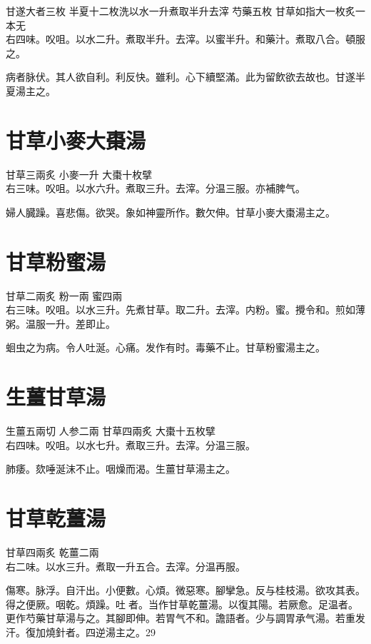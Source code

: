 甘遂{\scriptsize 大者三枚} 半夏{\scriptsize 十二枚洗以水一升煮取半升去滓} 芍藥{\scriptsize 五枚} 甘草{\scriptsize 如指大一枚炙一本无}\\
右四味。㕮咀。以水二升。煮取半升。去滓。以蜜半升。和藥汁。煮取八合。頓服之。

病者脉伏。其人欲自利。利反快。雖利。心下續堅滿。此为留飲欲去故也。甘遂半夏湯主之。

\section{甘草小麥大棗湯}

甘草{\scriptsize 三兩炙} 小麥{\scriptsize 一升} 大棗{\scriptsize 十枚擘}\\
右三味。㕮咀。以水六升。煮取三升。去滓。分温三服。亦補脾气。

婦人臓躁。喜悲傷。欲哭。象如神靈所作。數欠伸。甘草小麥大棗湯主之。

\section{甘草粉蜜湯}

甘草{\scriptsize 二兩炙} 粉{\scriptsize 一兩} 蜜{\scriptsize 四兩}\\
右三味。㕮咀。以水三升。先煮甘草。取二升。去滓。内粉。蜜。攪令和。煎如薄粥。温服一升。差即止。

蛔虫之为病。令人吐涎。心痛。发作有时。毒藥不止。甘草粉蜜湯主之。

\section{生薑甘草湯}

生薑{\scriptsize 五兩切} 人参{\scriptsize 二兩} 甘草{\scriptsize 四兩炙} 大棗{\scriptsize 十五枚擘}\\
右四味。㕮咀。以水七升。煮取三升。去滓。分温三服。

肺痿。欬唾涎沫不止。咽燥而渴。生薑甘草湯主之。

\section{甘草乾薑湯}

甘草{\scriptsize 四兩炙} 乾薑{\scriptsize 二兩}\\
右二味。以水三升。煮取一升五合。去滓。分温再服。

傷寒。脉浮。自汗出。小便數。心煩。微惡寒。腳攣急。反与桂枝湯。欲攻其表。得之便厥。咽乾。煩躁。吐{\sungtpii 𠱘}者。当作甘草乾薑湯。以復其陽。若厥愈。足温者。更作芍藥甘草湯与之。其腳即伸。若胃气不和。譫語者。少与{\khaaitp 調胃}承气湯。若重发汗。復加燒針者。四逆湯主之。29

